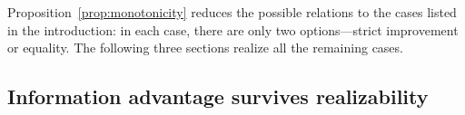 \documentclass{article}
\begin{document}
Proposition~\ref{prop:monotonicity} %
reduces the possible relations to the cases listed in the introduction: in each case, there are only two options---strict
improvement or equality.
The following three sections %
realize all %
the remaining cases.

\subsection{Information advantage survives realizability}
\label{s:Main__ss:pathada_realizability}




\end{document}
